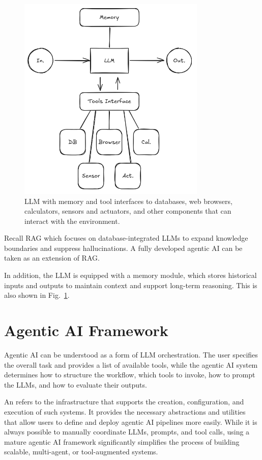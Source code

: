 \begin{figure}[!htb]
	\centering
	\includegraphics[width=0.8\textwidth]{./chapters/part-7/figures/agenticaiworkflow3.png}
	\caption{LLM with memory and tool interfaces to databases, web browsers, calculators, sensors and actuators, and other components that can interact with the environment.}
	\label{fig:agenticwf3}
\end{figure}

Recall RAG which focuses on database-integrated LLMs to expand knowledge boundaries and suppress hallucinations. A fully developed agentic AI can be taken as an extension of RAG.

In addition, the LLM is equipped with a memory module, which stores historical inputs and outputs to maintain context and support long-term reasoning. This is also shown in Fig.~\ref{fig:agenticwf3}.

\section{Agentic AI Framework}

Agentic AI can be understood as a form of LLM orchestration. The user specifies the overall task and provides a list of available tools, while the agentic AI system determines how to structure the workflow, which tools to invoke, how to prompt the LLMs, and how to evaluate their outputs.

An  refers to the infrastructure that supports the creation, configuration, and execution of such systems. It provides the necessary abstractions and utilities that allow users to define and deploy agentic AI pipelines more easily. While it is always possible to manually coordinate LLMs, prompts, and tool calls, using a mature agentic AI framework significantly simplifies the process of building scalable, multi-agent, or tool-augmented systems.

